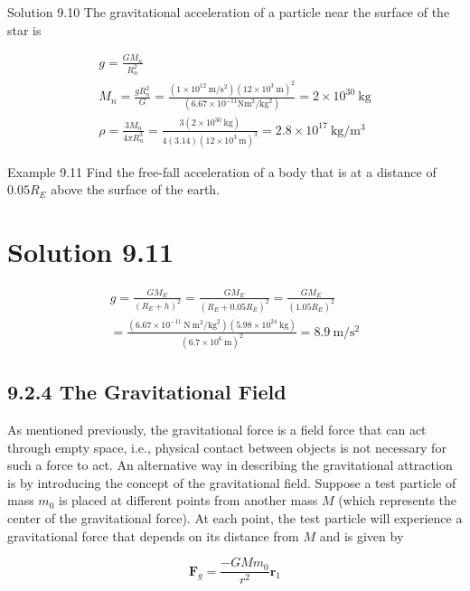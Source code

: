 \documentclass[10pt]{article}
\begin{document}
Solution 9.10 The gravitational acceleration of a particle near the surface of the star is

$$
\begin{gathered}
g=\frac{G M_{n}}{R_{n}^{2}} \\
M_{n}=\frac{g R_{n}^{2}}{G}=\frac{\left(1 \times 10^{12} \mathrm{~m} / \mathrm{s}^{2}\right)\left(12 \times 10^{3} \mathrm{~m}\right)^{2}}{\left(6.67 \times 10^{-11} \mathrm{Nm}^{2} / \mathrm{kg}^{2}\right)}=2 \times 10^{30} \mathrm{~kg} \\
\rho=\frac{3 M_{n}}{4 \pi R_{n}^{3}}=\frac{3\left(2 \times 10^{30} \mathrm{~kg}\right)}{4(3.14)\left(12 \times 10^{3} \mathrm{~m}\right)^{3}}=2.8 \times 10^{17} \mathrm{~kg} / \mathrm{m}^{3}
\end{gathered}
$$

Example 9.11 Find the free-fall acceleration of a body that is at a distance of $0.05 R_{E}$ above the surface of the earth.

\section*{Solution 9.11}
$$
\begin{gathered}
g=\frac{G M_{E}}{\left(R_{E}+h\right)^{2}}=\frac{G M_{E}}{\left(R_{E}+0.05 R_{E}\right)^{2}}=\frac{G M_{E}}{\left(1.05 R_{E}\right)^{2}} \\
=\frac{\left(6.67 \times 10^{-11} \mathrm{~N} \mathrm{~m}^{2} / \mathrm{kg}^{2}\right)\left(5.98 \times 10^{24} \mathrm{~kg}\right)}{\left(6.7 \times 10^{6} \mathrm{~m}\right)^{2}}=8.9 \mathrm{~m} / \mathrm{s}^{2}
\end{gathered}
$$

\subsection*{9.2.4 The Gravitational Field}
As mentioned previously, the gravitational force is a field force that can act through empty space, i.e., physical contact between objects is not necessary for such a force to act. An alternative way in describing the gravitational attraction is by introducing the concept of the gravitational field. Suppose a test particle of mass $m_{0}$ is placed at different points from another mass $M$ (which represents the center of the gravitational force). At each point, the test particle will experience a gravitational force that depends on its distance from $M$ and is given by

$$
\mathbf{F}_{g}=\frac{-G M m_{0}}{r^{2}} \mathbf{r}_{1}
$$
\end{document}

